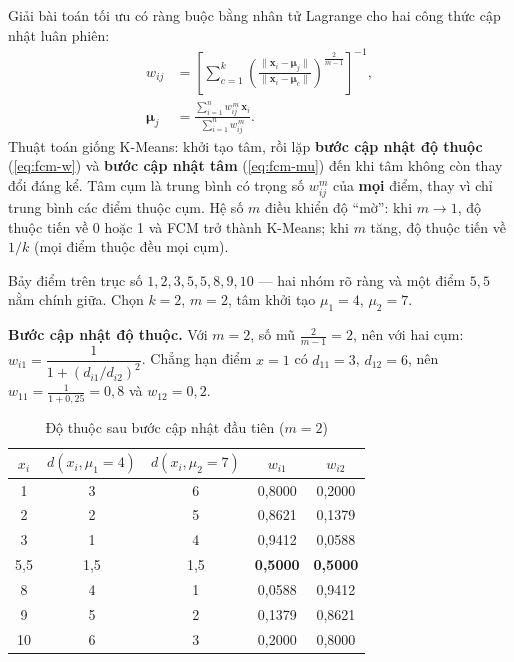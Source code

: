 Giải bài toán tối ưu có ràng buộc bằng nhân tử Lagrange cho hai công thức cập nhật luân phiên:
\begin{align}
    w_{ij} &= \left[\sum_{c=1}^{k}\left(\frac{\|\mathbf{x}_i - \boldsymbol{\mu}_j\|}{\|\mathbf{x}_i - \boldsymbol{\mu}_c\|}\right)^{\frac{2}{m - 1}}\right]^{-1}, \label{eq:fcm-w}\\
    \boldsymbol{\mu}_j &= \frac{\sum_{i=1}^{n} w_{ij}^{\,m}\,\mathbf{x}_i}{\sum_{i=1}^{n} w_{ij}^{\,m}} . \label{eq:fcm-mu}
\end{align}
Thuật toán giống K-Means: khởi tạo tâm, rồi lặp \textbf{bước cập nhật độ thuộc} (\ref{eq:fcm-w}) và \textbf{bước cập nhật tâm} (\ref{eq:fcm-mu}) đến khi tâm không còn thay đổi đáng kể. Tâm cụm là trung bình có trọng số $w_{ij}^m$ của \textbf{mọi} điểm, thay vì chỉ trung bình các điểm thuộc cụm. Hệ số $m$ điều khiển độ ``mờ'': khi $m \to 1$, độ thuộc tiến về 0 hoặc 1 và FCM trở thành K-Means; khi $m$ tăng, độ thuộc tiến về $1/k$ (mọi điểm thuộc đều mọi cụm).

\begin{example}
Bảy điểm trên trục số $1, 2, 3, 5{,}5, 8, 9, 10$ --- hai nhóm rõ ràng và một điểm $5{,}5$ nằm chính giữa. Chọn $k = 2$, $m = 2$, tâm khởi tạo $\mu_1 = 4$, $\mu_2 = 7$.
\end{example}

\noindent\textbf{Bước cập nhật độ thuộc.} Với $m = 2$, số mũ $\frac{2}{m-1} = 2$, nên với hai cụm: $w_{i1} = \dfrac{1}{1 + (d_{i1}/d_{i2})^2}$. Chẳng hạn điểm $x = 1$ có $d_{11} = 3$, $d_{12} = 6$, nên $w_{11} = \frac{1}{1 + 0{,}25} = 0{,}8$ và $w_{12} = 0{,}2$.

\begin{table}[H]
\centering
\begin{tabular}{|c|c|c|c|c|}
\hline
$x_i$ & $d(x_i, \mu_1 = 4)$ & $d(x_i, \mu_2 = 7)$ & $w_{i1}$ & $w_{i2}$ \\
\hline
1 & 3 & 6 & 0,8000 & 0,2000 \\ \hline
2 & 2 & 5 & 0,8621 & 0,1379 \\ \hline
3 & 1 & 4 & 0,9412 & 0,0588 \\ \hline
5,5 & 1,5 & 1,5 & \textbf{0,5000} & \textbf{0,5000} \\ \hline
8 & 4 & 1 & 0,0588 & 0,9412 \\ \hline
9 & 5 & 2 & 0,1379 & 0,8621 \\ \hline
10 & 6 & 3 & 0,2000 & 0,8000 \\ \hline
\end{tabular}
\caption{Độ thuộc sau bước cập nhật đầu tiên ($m = 2$)}
\label{tab:fcm}
\end{table}

